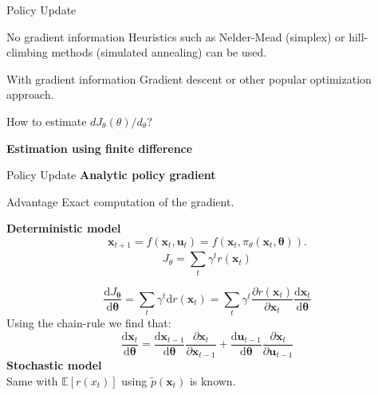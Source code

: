 \documentclass[10pt]{beamer}
\begin{document}
\begin{frame}[fragile]{Policy Update}
\begin{exampleblock}{No gradient information}
Heuristics such as Nelder-Mead (simplex) or hill-climbing methods (simulated annealing) can be used.
\end{exampleblock}

\begin{exampleblock}{With gradient information}
Gradient descent or other popular optimization approach.
\end{exampleblock}
\begin{alertblock}{How to estimate $d{ J }_{ \theta  }(\theta )/{ d }_{ \theta  }$?}
\end{alertblock}

\textbf{Estimation using finite difference}


\end{frame}

\begin{frame}[fragile]{Policy Update }
\textbf{Analytic policy gradient}
\begin{exampleblock}{Advantage}
Exact computation of the gradient. 
\end{exampleblock}
\textbf{Deterministic model}
$$\bm{x}_{t+1} = f(\bm{x}_t, \bm{u}_t)=f(\bm{x}_t, \pi_{\theta}(\bm{x}_{t},\bm{\theta})).
$$
$$J_{\theta}= \sum _{ t }^{   }{ { \gamma  }^{ t }r(\bm{x}_{t}) }$$

$$
\frac {\text{d} J_{\bm{\theta}}  }{\text{d}\bm{\theta}  }=\sum _{ t }^{   }{ { \gamma  }^{ t }\text{d}r(\bm{x}_{t}) }=\sum _{ t }^{   }{ { \gamma  }^{ t }\frac{\partial r(\bm{x}_t)}{\partial \bm{x}_t}\frac{\text{d}\bm{x}_t}{\text{d}\bm{\theta}} }
$$
Using the chain-rule we find that: 
$$ 
\frac{\text{d}\bm{x}_t}{\text{d}\bm{\theta}} =\frac{\text{d}\bm{x}_{t-1}}{\text{d}\bm{\theta}} \frac{\partial \bm{x}_{t}}{\partial\bm{x}_{t-1}} +\frac{\text{d}\bm{u}_{t-1}}{\text{d}\bm{\theta}} \frac{\partial \bm{x}_{t}}{\partial\bm{u}_{t-1}}
$$
\textbf{Stochastic model}\\
Same with $\mathbb{E}[r(x_t)]$ using $\widetilde{p}(\bm{x}_t)$ is known.
\end{frame}


\end{document}
